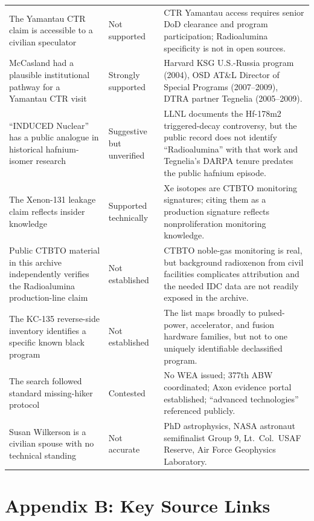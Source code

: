 \documentclass[11pt]{article}
\begin{document}
\begin{longtable}{@{}>{\raggedright\arraybackslash}p{} >{\raggedright\arraybackslash}p{} >{\raggedright\arraybackslash}p{}@{}}
The Yamantau CTR claim is accessible to a civilian speculator & Not supported & CTR Yamantau access requires senior DoD clearance and program participation; Radioalumina specificity is not in open sources. \\[4pt]
McCasland had a plausible institutional pathway for a Yamantau CTR visit & Strongly supported & Harvard KSG U.S.-Russia program (2004), OSD AT\&L Director of Special Programs (2007--2009), DTRA partner Tegnelia (2005--2009). \\[4pt]
``INDUCED Nuclear'' has a public analogue in historical hafnium-isomer research & Suggestive but unverified & LLNL documents the Hf-178m2 triggered-decay controversy, but the public record does not identify ``Radioalumina'' with that work and Tegnelia's DARPA tenure predates the public hafnium episode. \\[4pt]
The Xenon-131 leakage claim reflects insider knowledge & Supported technically & Xe isotopes are CTBTO monitoring signatures; citing them as a production signature reflects nonproliferation monitoring knowledge. \\[4pt]
Public CTBTO material in this archive independently verifies the Radioalumina production-line claim & Not established & CTBTO noble-gas monitoring is real, but background radioxenon from civil facilities complicates attribution and the needed IDC data are not readily exposed in the archive. \\[4pt]
The KC-135 reverse-side inventory identifies a specific known black program & Not established & The list maps broadly to pulsed-power, accelerator, and fusion hardware families, but not to one uniquely identifiable declassified program. \\[4pt]

The search followed standard missing-hiker protocol & Contested & No WEA issued; 377th ABW coordinated; Axon evidence portal established; ``advanced technologies'' referenced publicly. \\[4pt]
Susan Wilkerson is a civilian spouse with no technical standing & Not accurate & PhD astrophysics, NASA astronaut semifinalist Group 9, Lt.\ Col.\ USAF Reserve, Air Force Geophysics Laboratory. \\[4pt]

\end{longtable}

\section{Appendix B: Key Source Links}
\end{document}
